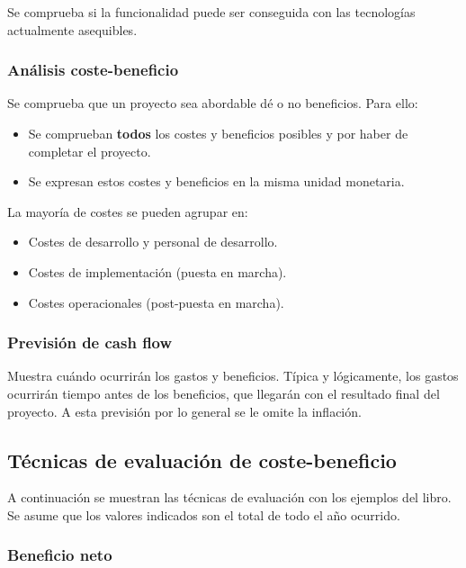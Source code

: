 \documentclass[12pt]{article}
\begin{document}
{Se comprueba si la funcionalidad puede ser conseguida con las tecnologías actualmente asequibles.}

\subsubsection{Análisis coste-beneficio}
\label{2.4.2}

{Se comprueba que un proyecto sea abordable dé o no beneficios. Para ello:}

\begin{itemize}
    \item {Se comprueban \textbf{todos} los costes y beneficios posibles y por haber de completar el proyecto.}
    \item {Se expresan estos costes y beneficios en la misma unidad monetaria.}
\end{itemize}

{La mayoría de costes se pueden agrupar en:}

\begin{itemize}
    \item {Costes de desarrollo y personal de desarrollo.}
    \item {Costes de implementación (puesta en marcha).}
    \item {Costes operacionales (post-puesta en marcha).}
\end{itemize}

\subsubsection{Previsión de cash flow}
\label{2.4.3}

{Muestra cuándo ocurrirán los gastos y beneficios. Típica y lógicamente, los gastos ocurrirán tiempo antes de los beneficios, que llegarán con el resultado final del proyecto. A esta previsión por lo general se le omite la inflación.}

\subsection{Técnicas de evaluación de coste-beneficio}
\label{2.5.0}

{A continuación se muestran las técnicas de evaluación con los ejemplos del libro. Se asume que los valores indicados son el total de todo el año ocurrido.}

\subsubsection{Beneficio neto}
\label{2.5.1}
\end{document}
